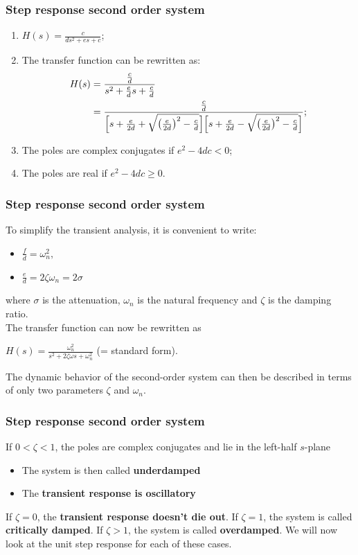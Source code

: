 \begin{frame}
\frametitle{Step response second order system}
\begin{enumerate}
\item $H(s) = \frac{c}{ds^2+es+c}$;
\item The transfer function can be rewritten as:
\begin{align*}
H(s) &= \frac{\frac{c}{d}}{s^2+\frac{e}{d}s+\frac{c}{d}}
\vspace{-0.1cm}\\ &= \frac{\frac{c}{d}}{\Big[s+\frac{e}{2d}+\sqrt{\big(\frac{e}{2d}\big)^2-\frac{c}{d}}\Big]\Big[s+\frac{e}{2d}-\sqrt{\big(\frac{e}{2d}\big)^2-\frac{c}{d}}\Big]};
\end{align*}
\item The poles are complex conjugates if $e^2 -4dc <0$;
\item The poles are real if $e^2 -4dc\ge 0$.
\end{enumerate}
\end{frame}

\begin{frame}
\frametitle{Step response second order system}

To simplify the transient analysis, it is convenient to write:
\begin{itemize}
\item $\frac{f}{d} = \omega_n ^2\text{, }$
\item $\frac{e}{d}=2\zeta\omega_n=2\sigma$
\end{itemize}
where $\sigma$ is the attenuation, $\omega_n$ is the natural frequency and $\zeta$ is the damping ratio.\\
\vspace{0.5em}
The transfer function can now be rewritten as\\
\begin{center}
$H(s) = \frac{\omega_n ^2}{s^2+2\zeta\omega s +\omega_n ^2}$ (= standard form).\\
\end{center}

The dynamic behavior of the second-order system can then be described in terms of only two parameters $\zeta$ and $\omega_n$.
\end{frame}

\begin{frame}
\frametitle{Step response second order system}
If $0<\zeta<1$, the poles are complex conjugates and lie in the left-half $s$-plane
\begin{itemize}
\item The system is then called \textbf{underdamped}
\item The \textbf{transient response is oscillatory}
\end{itemize}
\vspace{0.15cm}
If $\zeta=0$, the \textbf{transient response doesn't die out}. If $\zeta=1$, the system is called \textbf{critically damped}. If $\zeta>1$, the system is called \textbf{overdamped}. We will now look at the unit step response for each of these cases.
\end{frame}

